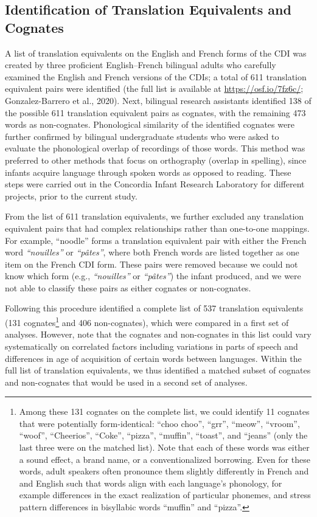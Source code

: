 \documentclass[
  ,man,floatsintext]{apa6}
\begin{document}
\hypertarget{identification-of-translation-equivalents-and-cognates}{%
\subsection{Identification of Translation Equivalents and Cognates}\label{identification-of-translation-equivalents-and-cognates}}

A list of translation equivalents on the English and French forms of the CDI was created by three proficient English--French bilingual adults who carefully examined the English and French versions of the CDIs; a total of 611 translation equivalent pairs were identified (the full list is available at \url{https://osf.io/7fz6c/}; Gonzalez-Barrero et al., 2020). Next, bilingual research assistants identified 138 of the possible 611 translation equivalent pairs as cognates, with the remaining 473 words as non-cognates. Phonological similarity of the identified cognates were further confirmed by bilingual undergraduate students who were asked to evaluate the phonological overlap of recordings of those words. This method was preferred to other methods that focus on orthography (overlap in spelling), since infants acquire language through spoken words as opposed to reading. These steps were carried out in the Concordia Infant Research Laboratory for different projects, prior to the current study.

From the list of 611 translation equivalents, we further excluded any translation equivalent pairs that had complex relationships rather than one-to-one mappings. For example, ``noodle'' forms a translation equivalent pair with either the French word \emph{``nouilles''} or \emph{``pâtes''}, where both French words are listed together as one item on the French CDI form. These pairs were removed because we could not know which form (e.g., \emph{``nouilles''} or \emph{``pâtes''}) the infant produced, and we were not able to classify these pairs as either cognates or non-cognates.

Following this procedure identified a complete list of 537 translation equivalents (131 cognates\footnote{Among these 131 cognates on the complete list, we could identify 11 cognates that were potentially form-identical: ``choo choo'', ``grr'', ``meow'', ``vroom'', ``woof'', ``Cheerios'', ``Coke'', ``pizza'', ``muffin'', ``toast'', and ``jeans'' (only the last three were on the matched list). Note that each of these words was either a sound effect, a brand name, or a conventionalized borrowing. Even for these words, adult speakers often pronounce them slightly differently in French and and English such that words align with each language's phonology, for example differences in the exact realization of particular phonemes, and stress pattern differences in bisyllabic words ``muffin'' and ``pizza''.} and 406 non-cognates), which were compared in a first set of analyses. However, note that the cognates and non-cognates in this list could vary systematically on correlated factors including variations in parts of speech and differences in age of acquisition of certain words between languages. Within the full list of translation equivalents, we thus identified a matched subset of cognates and non-cognates that would be used in a second set of analyses.
\end{document}
